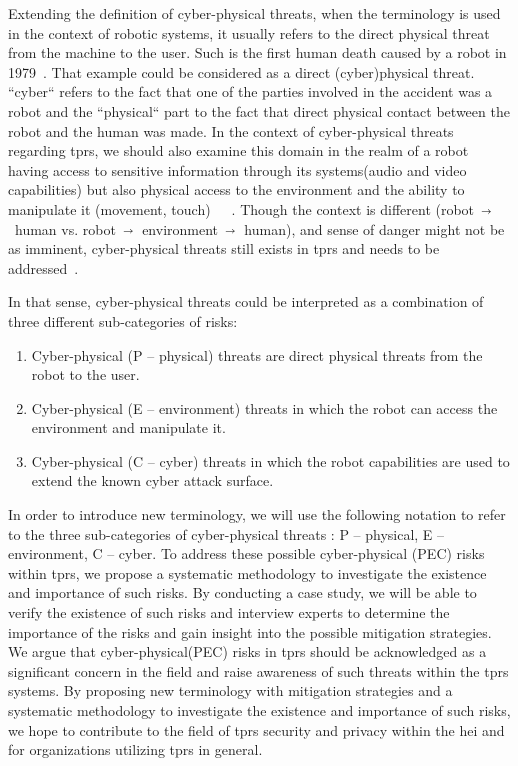 Extending the definition of cyber-physical threats, when the terminology is used in the context of robotic systems, it usually refers to
the direct physical threat from the machine to the user. Such is the first human death caused by a robot in 1979~\cite[2]{robot_security_framework_2018}.
That example could be considered as a direct (cyber)physical threat. ``cyber`` refers to the fact that one of the parties involved in the
accident was a robot and the ``physical`` part to the fact that
direct physical contact between the robot and the human was made. In the context of cyber-physical threats regarding \ac{tprs}, we should also examine this domain in
the realm of a robot having access to sensitive information through its systems(audio and video
capabilities) but also physical access to the environment and the ability to manipulate it (movement, touch)~\cite[982]{role_of_security_in_human_robot_2017}~\cite[250]{
  role_of_cyber_security_in_higher_edu_2020}~\cite[11]{analyzing_cyber_physical_threats_2018}.
Though the context is different (robot~$\shortrightarrow$~human vs. robot~$\shortrightarrow$~environment~$\shortrightarrow$~human), and sense of
danger might not be as imminent, cyber-physical threats
still
exists in \ac{tprs}
and
needs to
be addressed~\cite[2]{cyber_sec_safet_robots_legal_2021}.

In that sense, cyber-physical threats could be interpreted as a combination of
three different sub-categories of risks:

\begin{enumerate}
  \item{Cyber-physical (P -- physical) threats are direct physical threats from the robot to the user.}
  \item{Cyber-physical (E -- environment) threats in which the robot can access the environment and manipulate it.}
  \item{Cyber-physical (C -- cyber) threats in which the robot capabilities are used to extend the known cyber attack surface.}
\end{enumerate}

In order to introduce new terminology, we will use the following notation to refer to the three sub-categories of cyber-physical threats
: P -- physical, E -- environment, C -- cyber. To address these possible cyber-physical (PEC) risks within \ac{tprs}, we
propose a systematic methodology to investigate the existence and importance of such risks. By conducting a case study, we will be able to
verify the existence of such risks and interview experts to determine the importance of the risks and gain insight into the possible
mitigation strategies. We argue that cyber-physical(PEC) risks in \ac{tprs} should be acknowledged as a significant concern in
the field and raise awareness of such threats within the \ac{tprs} systems. By proposing new terminology with
mitigation strategies and a systematic methodology to investigate the existence and importance of such risks, we hope to contribute to the
field of \ac{tprs} security and privacy within the \ac{hei} and for organizations utilizing \ac{tprs} in general.

